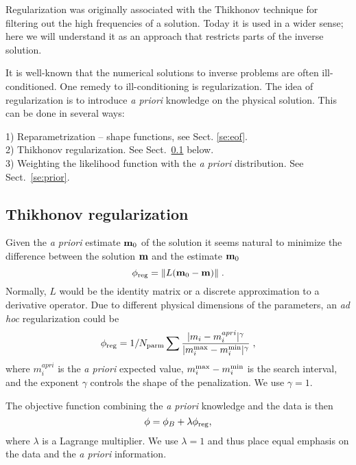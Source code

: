 \documentclass{saclantc}
\begin{document}
Regularization was originally associated with the
Thikhonov technique
for filtering out the high frequencies of a solution. Today it is used in a
wider sense; here we will understand it as an approach that restricts
parts of the inverse solution.

It is well-known that the numerical solutions to inverse problems are
often ill-conditioned. 
One remedy to  ill-conditioning is 
regularization. The idea of regularization is to introduce {\it a priori}
knowledge on the physical solution. This can be done in several ways:

1) Reparametrization -- shape functions, see Sect. \ref{se:eof}.\\
2) Thikhonov regularization. See Sect.\ \ref{se:tik} below.\\
3) Weighting the likelihood function with the {\it a priori} distribution.
 See Sect.\ \ref{se:prior}.

\subsection{Thikhonov regularization}
\label{se:tik}

Given the {\it a priori} estimate ${\bf m}_0$ of the solution it seems
natural to minimize the difference between the solution ${\bf m}$
 and the estimate  ${\bf m}_0$
\begin{equation}
\phi_{\rm reg} = \| L({\bf m}_0 -{\bf m}) \| \; .
\end{equation}
Normally, $ L $ would be the identity matrix or a discrete approximation to
a derivative operator. Due to different physical dimensions of the parameters,
an {\it ad hoc} regularization could be
\begin{equation}
\phi_{\rm reg} = 1 / N_{\rm parm}
         \sum \frac{|m_i - m_i^{apri}|^\gamma}
                 {|m_i^{\rm max} - m_i^{\rm min}|^{\gamma}}\; ,
\label{eq:reg}
\end{equation}
where $m_i^{apri}$  is the {\it a priori} expected value,
$m_i^{\rm max} - m_i^{\rm min}$ is the search interval, and the exponent
$\gamma$ controls the shape of the penalization. %
 We use $ \gamma =1$.

The objective function combining the {\it a priori} knowledge and the data is then
\begin{equation}
\phi = \phi_B + \lambda \phi_{\rm reg},
\label{eq:reg1}
\end{equation}
where 
$ \lambda$ is a Lagrange multiplier.  We use $ \lambda=1$ and thus place 
equal emphasis on the data and the {\it a priori} information.
\end{document}

